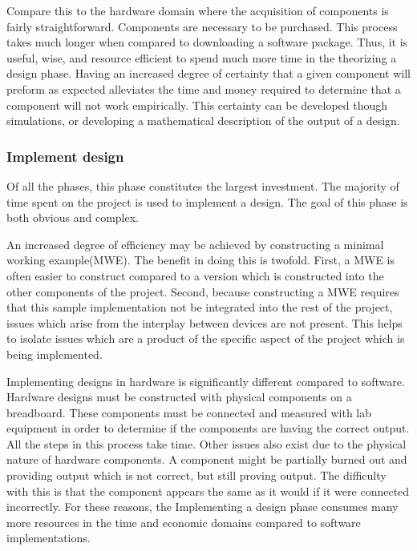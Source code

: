 \documentclass{article}	%
\begin{document}
\begin{multicols}{2}
Compare this to the hardware domain where
the acquisition of components is fairly straightforward.
Components are necessary to be purchased.
This process takes much longer when compared
to downloading a software package.
Thus, it is useful, wise, and resource efficient to
spend much more time in the theorizing a design phase.
Having an increased degree of certainty that 
a given component will preform as expected
alleviates the time and money required to determine 
that a component will not work empirically.
This certainty can be developed though simulations, or
developing a mathematical description of the output of a design.

\subsubsection{Implement design}
Of all the phases, 
this phase constitutes the largest investment.
The majority of time spent on the project is
used to implement a design.
The goal of this phase is both obvious
and complex.

An increased degree of efficiency may be achieved by
constructing a minimal working example(MWE).
The benefit in doing this is twofold.
First, a MWE is often easier to construct compared to
a version which is constructed into the other
components of the project.
Second, because constructing a MWE requires that
this sample implementation not be integrated into
the rest of the project,
issues which arise from the interplay between devices are not present.
This helps to isolate issues which are a product
of the specific aspect of the project which is being implemented.

Implementing designs in hardware is significantly different compared to software.
Hardware designs must be constructed with physical components on a breadboard.
These components must be connected and measured with lab equipment
in order to determine if the components are having the correct output.
All the steps in this process take time.
Other issues also exist due to the physical nature of 
hardware components.
A component might be partially burned out and providing output
which is not correct, but still proving output.
The difficulty with this is that the component appears
the same as it would if it were connected incorrectly.
For these reasons,
the Implementing a design phase 
consumes many more resources in the time and economic
domains compared to software implementations.


\end{multicols}
\end{document}
